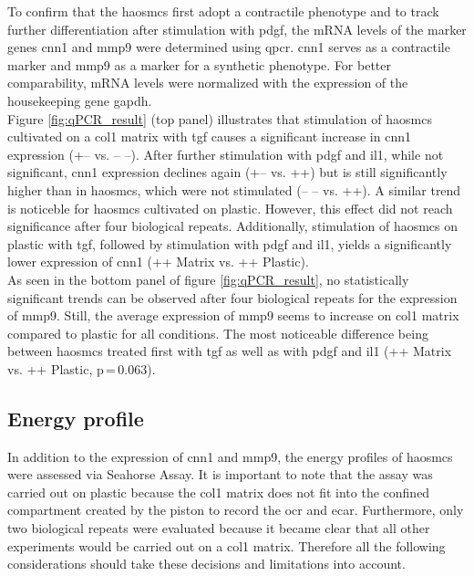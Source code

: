     To confirm that the \acp{haosmc} first adopt a contractile phenotype and to track further differentiation after stimulation with \ac{pdgf}, the \ac{mRNA} levels of the marker genes \ac{cnn1} and \ac{mmp9} were determined using \ac{qpcr}. \ac{cnn1} serves as a contractile marker and \ac{mmp9} as a marker for a synthetic phenotype. For better comparability, \ac{mRNA} levels were normalized with the expression of the housekeeping gene \ac{gapdh}.\\
    Figure \ref{fig:qPCR_result} (top panel) illustrates that stimulation of \acp{haosmc} cultivated on a \ac{col1} matrix with \ac{tgf} causes a significant increase in \ac{cnn1} expression (+– vs. – –). After further stimulation with \ac{pdgf} and \ac{il1}, while not significant, \ac{cnn1} expression declines again (+– vs. ++) but is still significantly higher than in \acp{haosmc}, which were not stimulated (– – vs. ++). A similar trend is noticeble for \acp{haosmc} cultivated on plastic. However, this effect did not reach significance after four biological repeats. Additionally, stimulation of \acp{haosmc} on plastic with \ac{tgf}, followed by stimulation with \ac{pdgf} and \ac{il1}, yields a significantly lower expression of \ac{cnn1} (++ Matrix vs. ++ Plastic).\\
    As seen in the bottom panel of figure \ref{fig:qPCR_result}, no statistically significant trends can be observed after four biological repeats for the expression of \ac{mmp9}. Still, the average expression of \ac{mmp9} seems to increase on \ac{col1} matrix compared to plastic for all conditions. The most noticeable difference being between \acp{haosmc} treated first with \ac{tgf} as well as with \ac{pdgf} and \ac{il1} (++ Matrix vs. ++ Plastic, p\,=\,0.063).

    \pagebreak
    \subsection{Energy profile}
    \label{subsec:energy}
    In addition to the expression of \ac{cnn1} and \ac{mmp9}, the energy profiles of \acp{haosmc} were assessed via Seahorse Assay. It is important to note that the assay was carried out on plastic because the \ac{col1} matrix does not fit into the confined compartment created by the piston to record the \ac{ocr} and \ac{ecar}. Furthermore, only two biological repeats were evaluated because it became clear that all other experiments would be carried out on a \ac{col1} matrix. Therefore all the following considerations should take these decisions and limitations into account.

